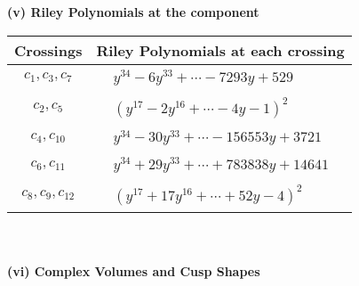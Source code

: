 \documentclass[1p]{elsarticle_modified}
\theoremstyle{definition}
\begin{document}
\newpage\renewcommand{\arraystretch}{1}
\flushleft \textbf{(v) Riley Polynomials at the component}\newline \\
\begin{tabular}{m{50pt}|m{274pt}}
Crossings & \hspace{64pt}Riley Polynomials at each crossing \\
\hline $$\begin{aligned}c_{1},c_{3},c_{7}\end{aligned}$$&$\begin{aligned}
&y^{34}-6 y^{33}+\cdots-7293 y+529
\end{aligned}$\\
\hline $$\begin{aligned}c_{2},c_{5}\end{aligned}$$&$\begin{aligned}
&(y^{17}-2 y^{16}+\cdots-4 y-1)^{2}
\end{aligned}$\\
\hline $$\begin{aligned}c_{4},c_{10}\end{aligned}$$&$\begin{aligned}
&y^{34}-30 y^{33}+\cdots-156553 y+3721
\end{aligned}$\\
\hline $$\begin{aligned}c_{6},c_{11}\end{aligned}$$&$\begin{aligned}
&y^{34}+29 y^{33}+\cdots+783838 y+14641
\end{aligned}$\\
\hline $$\begin{aligned}c_{8},c_{9},c_{12}\end{aligned}$$&$\begin{aligned}
&(y^{17}+17 y^{16}+\cdots+52 y-4)^{2}
\end{aligned}$\\
\hline
\end{tabular}\\~\\
\newpage\flushleft \textbf{(vi) Complex Volumes and Cusp Shapes}
\end{document}
